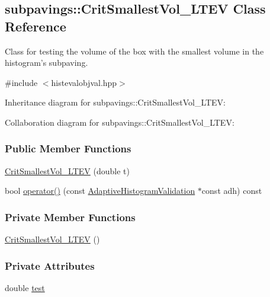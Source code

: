 \hypertarget{classsubpavings_1_1CritSmallestVol__LTEV}{\subsection{subpavings\-:\-:\-Crit\-Smallest\-Vol\-\_\-\-L\-T\-E\-V \-Class \-Reference}
\label{classsubpavings_1_1CritSmallestVol__LTEV}
}


\-Class for testing the volume of the box with the smallest volume in the histogram's subpaving.  




{\ttfamily \#include $<$histevalobjval.\-hpp$>$}



\-Inheritance diagram for subpavings\-:\-:\-Crit\-Smallest\-Vol\-\_\-\-L\-T\-E\-V\-:


\-Collaboration diagram for subpavings\-:\-:\-Crit\-Smallest\-Vol\-\_\-\-L\-T\-E\-V\-:
\subsubsection*{\-Public \-Member \-Functions}
\begin{DoxyCompactItemize}
\item 
\hyperlink{classsubpavings_1_1CritSmallestVol__LTEV_aaf21b36c466714a020f6e5cd60b4b745}{\-Crit\-Smallest\-Vol\-\_\-\-L\-T\-E\-V} (double t)
\item 
bool \hyperlink{classsubpavings_1_1CritSmallestVol__LTEV_a333d65dbd5d82b81df266cb1d2372acd}{operator()} (const \hyperlink{classsubpavings_1_1AdaptiveHistogramValidation}{\-Adaptive\-Histogram\-Validation} $\ast$const adh) const 
\end{DoxyCompactItemize}
\subsubsection*{\-Private \-Member \-Functions}
\begin{DoxyCompactItemize}
\item 
\hyperlink{classsubpavings_1_1CritSmallestVol__LTEV_a2a61ec982685893c7c20355c8270d92d}{\-Crit\-Smallest\-Vol\-\_\-\-L\-T\-E\-V} ()
\end{DoxyCompactItemize}
\subsubsection*{\-Private \-Attributes}
\begin{DoxyCompactItemize}
\item 
double \hyperlink{classsubpavings_1_1CritSmallestVol__LTEV_ab806e08cdf3e5c0b4e6411df0d76db3c}{test}
\end{DoxyCompactItemize}


